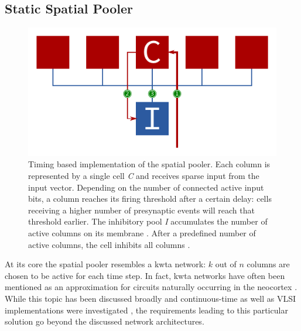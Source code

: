 %
%

\subsection{Static Spatial Pooler}

\begin{figure}
	\begin{center}
		\includegraphics{../circuitry/spatial_pooler_2.pdf}
	\end{center}
	\caption{Timing based implementation of the spatial pooler. Each column is represented by a single cell \emph{C} and receives sparse input \protect{} from the input vector. Depending on the number of connected active input bits, a column reaches its firing threshold after a certain delay: cells receiving a higher number of presynaptic events will reach that threshold earlier. The inhibitory pool \emph{I} accumulates the number of active columns on its membrane \protect{}. After a predefined number of active columns, the cell inhibits all columns \protect{}.}
	\label{fig:spatial_pooler}
\end{figure}

At its core the spatial pooler resembles a \gls{kwta} network: $k$ out of $n$ columns are chosen to be active for each time step. In fact, \gls{kwta} networks have often been mentioned as an approximation for circuits naturally occurring in the neocortex \citep{felch2008hypergeometric}. While this topic has been discussed broadly and continuous-time as well as VLSI implementations were investigated \citep{erlanson1991analog,tymoshchuk2012,maass2000neural}, the requirements leading to this particular solution go beyond the discussed network architectures.

